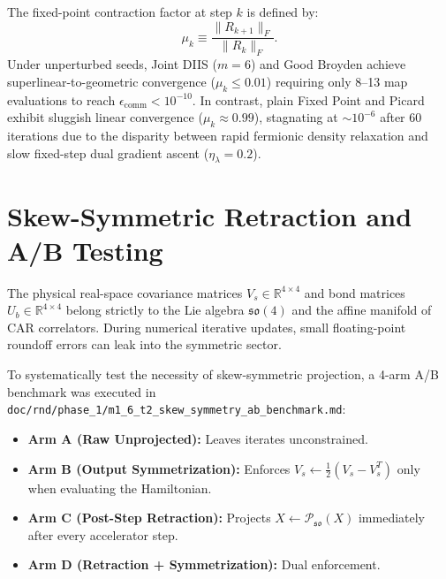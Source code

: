 \begin{proposition}
\label{prop:m1_6_convergence_rates}
The fixed-point contraction factor at step $k$ is defined by:
\begin{equation}
\label{eq:m1_6_contraction_factor}
\mu_k \equiv \frac{\|R_{k+1}\|_F}{\|R_k\|_F}.
\end{equation}
Under unperturbed seeds, Joint DIIS ($m=6$) and Good Broyden achieve superlinear-to-geometric convergence ($\mu_k \le 0.01$) requiring only 8--13 map evaluations to reach $\epsilon_{\mathrm{comm}} < 10^{-10}$. In contrast, plain Fixed Point and Picard exhibit sluggish linear convergence ($\mu_k \approx 0.99$), stagnating at $\sim 10^{-6}$ after 60 iterations due to the disparity between rapid fermionic density relaxation and slow fixed-step dual gradient ascent ($\eta_\lambda = 0.2$).
\end{proposition}

\section{Skew-Symmetric Retraction and A/B Testing}
\label{sec:m1_6_ab_retraction}

The physical real-space covariance matrices $V_s \in \mathbb{R}^{4 \times 4}$ and bond matrices $U_b \in \mathbb{R}^{4 \times 4}$ belong strictly to the Lie algebra $\mathfrak{so}(4)$ and the affine manifold of CAR correlators. During numerical iterative updates, small floating-point roundoff errors can leak into the symmetric sector.

To systematically test the necessity of skew-symmetric projection, a 4-arm A/B benchmark was executed in \texttt{doc/rnd/phase\_1/m1\_6\_t2\_skew\_symmetry\_ab\_benchmark.md}:
\begin{itemize}
\item \textbf{Arm A (Raw Unprojected):} Leaves iterates unconstrained.
\item \textbf{Arm B (Output Symmetrization):} Enforces $V_s \leftarrow \frac{1}{2}(V_s - V_s^T)$ only when evaluating the Hamiltonian.
\item \textbf{Arm C (Post-Step Retraction):} Projects $X \leftarrow \mathcal{P}_{\mathfrak{so}}(X)$ immediately after every accelerator step.
\item \textbf{Arm D (Retraction + Symmetrization):} Dual enforcement.
\end{itemize}

